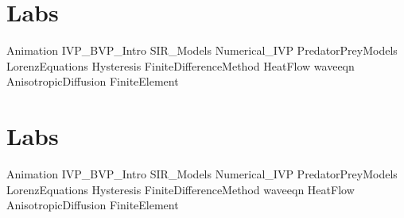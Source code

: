 \documentclass[opener-c,labs,green,nociteref]{HJnewsiambook}
\begin{document}
\ifbyu

\part{Labs} %
{Animation}
{IVP_BVP_Intro}
{SIR_Models}
{Numerical_IVP} 
{PredatorPreyModels}
{LorenzEquations}
{Hysteresis}
{FiniteDifferenceMethod}
{HeatFlow}
{waveeqn}
{AnisotropicDiffusion}
{FiniteElement}


\else 

\part{Labs} %
{Animation}
{IVP_BVP_Intro}
{SIR_Models}
{Numerical_IVP} 
{PredatorPreyModels}
{LorenzEquations}
{Hysteresis}
{FiniteDifferenceMethod}
{waveeqn}
{HeatFlow}
{AnisotropicDiffusion}
{FiniteElement}
\end{document}
